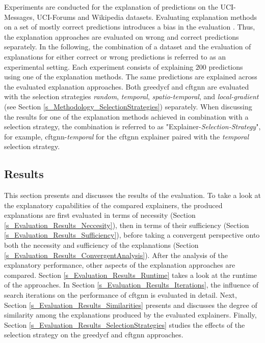 Experiments are conducted for the explanation of predictions on the UCI-Messages, UCI-Forums and Wikipedia datasets. Evaluating explanation methods on a set of mostly correct predictions introduces a bias in the evaluation \cite{amara_graphframex_2022}. Thus, the explanation approaches are evaluated on wrong and correct predictions separately. In the following, the combination of a dataset and the evaluation of explanations for either correct or wrong predictions is referred to as an experimental setting. Each experiment consists of explaining $200$ predictions using one of the explanation methods. The same predictions are explained across the evaluated explanation approaches. Both \gls{greedycf} and \gls{cftgnn} are evaluated with the selection strategies \textit{random}, \textit{temporal}, \textit{spatio-temporal}, and \textit{local-gradient} (see Section \ref{s_Methodology_SelectionStrategies}) separately. When discussing the results for one of the explanation methods achieved in combination with a selection strategy, the combination is referred to as "Explainer-\textit{Selection-Strategy}", for example, \gls{cftgnn}-\textit{temporal} for the \gls{cftgnn} explainer paired with the \textit{temporal} selection strategy.

\FloatBarrier
\subsection{Results}
\label{s_Evaluation_Results}

This section presents and discusses the results of the evaluation. To take a look at the explanatory capabilities of the compared explainers, the produced explanations are first evaluated in terms of necessity (Section \ref{s_Evaluation_Results_Neccesity}), then in terms of their sufficiency (Section \ref{s_Evaluation_Results_Sufficiency}), before taking a convergent perspective onto both the necessity and sufficiency of the explanations (Section \ref{s_Evaluation_Results_ConvergentAnalysis}). After the analysis of the explanatory performance, other aspects of the explanation approaches are compared. Section \ref{s_Evaluation_Results_Runtime} takes a look at the runtime of the approaches. In Section \ref{s_Evaluation_Results_Iterations}, the influence of search iterations on the performance of \gls{cftgnn} is evaluated in detail. Next, Section \ref{s_Evaluation_Results_Similarities} presents and discusses the degree of similarity among the explanations produced by the evaluated explainers. Finally, Section \ref{s_Evaluation_Results_SelectionStrategies} studies the effects of the selection strategy on the \gls{greedycf} and \gls{cftgnn} approaches.


